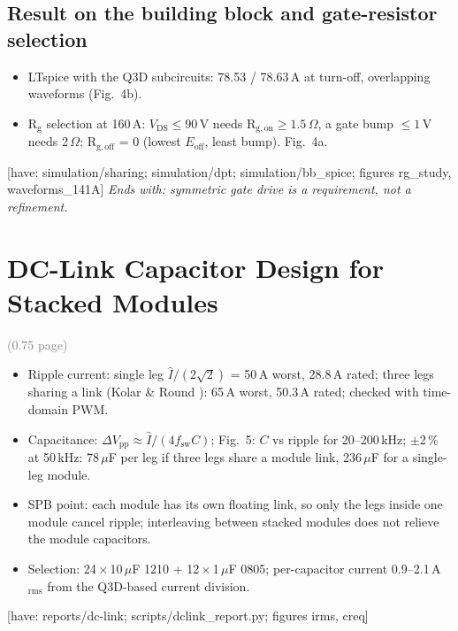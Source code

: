 \documentclass[conference]{IEEEtran}
\newcommand{\uF}{\ensuremath{\mu}F}
\newcommand{\plan}[1]{\textcolor{blue!60!black}{\textit{#1}}}
\newcommand{\have}[1]{\textcolor{green!40!black}{\small[have: #1]}}
\newcommand{\pages}[1]{\hfill\textcolor{gray}{\small(#1 page)}}
\begin{document}
\subsection{Result on the building block and gate-resistor selection}
\begin{itemize}
\item LTspice with the Q3D subcircuits: 78.53 / 78.63\,A at turn-off, overlapping waveforms (Fig.~4b).
\item R$_\mathrm{g}$ selection at 160\,A: $V_\mathrm{DS}\leq90$\,V needs R$_\mathrm{g,on}\geq1.5\,\Omega$, a gate bump $\leq1$\,V needs 2\,$\Omega$; R$_\mathrm{g,off}$ = 0 (lowest $E_\mathrm{off}$, least bump). Fig.~4a.
\end{itemize}
\have{simulation/sharing; simulation/dpt; simulation/bb\_spice; figures rg\_study, waveforms\_141A}
\plan{Ends with: symmetric gate drive is a requirement, not a refinement.}

\section{DC-Link Capacitor Design for Stacked Modules}\label{sec:dclink}\pages{0.75}
\begin{itemize}
\item Ripple current: single leg $\hat I/(2\sqrt2)$ = 50\,A worst, 28.8\,A rated; three legs sharing a link (Kolar \& Round \cite{kolar}): 65\,A worst, 50.3\,A rated; checked with time-domain PWM.
\item Capacitance: $\Delta V_\mathrm{pp}\approx\hat I/(4f_\mathrm{sw}C)$; Fig.~5: $C$ vs ripple for 20--200\,kHz; $\pm$2\,\% at 50\,kHz: 78\,\uF{} per leg if three legs share a module link, 236\,\uF{} for a single-leg module.
\item SPB point: each module has its own floating link, so only the legs inside one module cancel ripple; interleaving between stacked modules does not relieve the module capacitors.
\item Selection: 24\,$\times$\,10\,\uF{} 1210 + 12\,$\times$\,1\,\uF{} 0805; per-capacitor current 0.9--2.1\,A$_\mathrm{rms}$ from the Q3D-based current division.
\end{itemize}
\have{reports/dc-link; scripts/dclink\_report.py; figures irms, creq}

\end{document}
